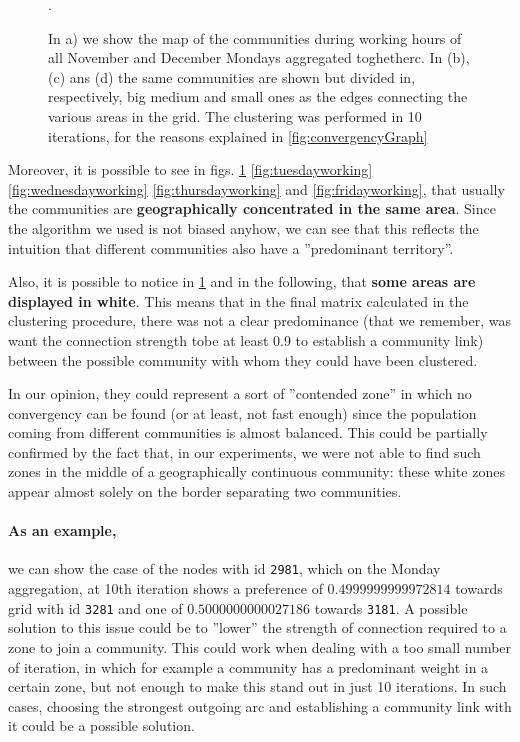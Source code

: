 \documentclass[12pt,a4paper]{article}
\begin{document}
\begin{figure}[H]
\caption{In a) we show the map of the communities during working hours of all November and December Mondays aggregated toghetherc. 
In (b), (c) ans (d) the same communities are shown but divided in, respectively, big medium and small ones as the edges connecting the various areas in the grid.
The clustering was performed in 10 iterations, for the reasons explained in \ref{fig:convergencyGraph}}.
\label{fig:mondayworking}
\end{figure}

Moreover, it is possible to see in figs. \ref{fig:mondayworking} \ref{fig:tuesdayworking} \ref{fig:wednesdayworking} \ref{fig:thursdayworking} and \ref{fig:fridayworking}, that usually the communities are \textbf{geographically concentrated in the same area}. Since the algorithm we used is not biased anyhow, we can see
that this reflects the intuition that different communities also have a ''predominant territory''.

Also, it is possible to notice in \ref{fig:mondayworking} and in the following, that 
\textbf{some areas are displayed in white}. This means that in the final matrix calculated in the clustering procedure, there was not a clear predominance (that we remember, was want the connection strength tobe at least 0.9 to establish a community link) between the possible community with whom they could have been clustered.

In our opinion, they could represent a sort of ''contended zone'' in which no convergency can be found (or at least, not fast enough) since the population coming from different communities is almost balanced. This could be partially confirmed by the fact that, in our experiments,
we were not able to find such zones in the middle of a geographically continuous community: these white zones appear almost solely on the border separating two communities.

\paragraph{As an example,} we can show the case of the nodes with id \texttt{2981}, which on the Monday aggregation, at 10th iteration shows a preference of $0.4999999999972814$ towards grid with id \texttt{3281} and one of $0.5000000000027186$ towards \texttt{3181}.
A possible solution to this issue could be to ''lower'' the strength of connection required to a zone to join a community. This could work when dealing with a too small number of iteration, in which for example a community has a predominant weight in a certain zone, but not enough to make this stand out in just 10 iterations. In such cases, choosing the strongest outgoing arc and establishing a community link with it could be a possible solution. 
\end{document}
